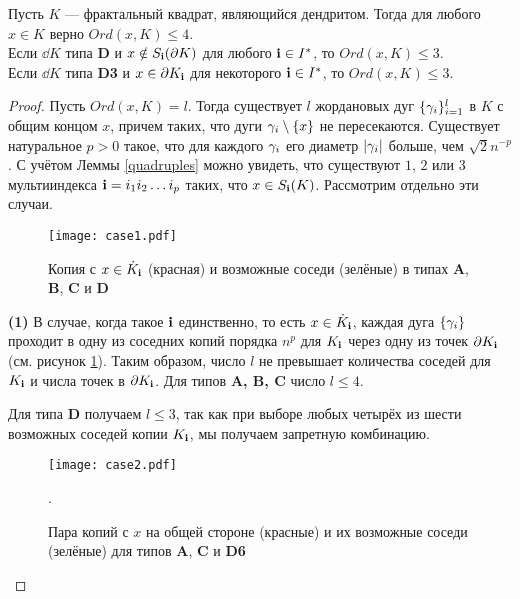 
\begin{theorem}\label{order}
Пусть $K$ --- фрактальный квадрат, являющийся дендритом. 
Тогда для любого  $x\in K$ верно $Ord(x,K)\le 4$.\\
Если $\dd K$ типа {\bf D} и $x\notin S_{\bf{i}}(\partial K)$ для любого ${\bf{i}}\in I^*$, то $Ord(x,K)\le 3$.\\
Если $\dd K$ типа {\bf D3} и $x\in \partial K_{\bf{i}}$ для некоторого ${\bf{i}}\in I^*$, то $Ord(x, K)\le 3$.
\end{theorem}

\begin{proof}\label{proof:point_branching}
Пусть $Ord(x,K)=l$.
Тогда существует $l$ жордановых дуг $\{\gamma_i\}_{i=1}^l$ в $K$ с общим концом $x$, причем таких, что дуги $\gamma_i\setminus \{x\}$ не пересекаются.
Существует натуральное $p>0$ такое, что для каждого $\gamma_i$ его диаметр $|\gamma_i|$ больше, чем $\sqrt{2}n^{-p}$.
С учётом Леммы \ref{quadruples} можно увидеть, что существуют $1$, $2$ или $3$ мультииндекса ${\bf{i}}=i_1i_2\ldots i_p$ таких, что $x\in S_{\bf{i}}(K)$.
Рассмотрим отдельно эти случаи.

\begin{figure}[H]
\centering
\texttt{[image: case1.pdf]}
\caption{Копия с $x\in\dot K_{\bf{i}}$ (красная) и возможные соседи (зелёные) в типах \textbf{A}, \textbf{B}, \textbf{C} и \textbf{D}}
\label{fig:case1}
\end{figure}

\textbf{(1)} В случае, когда такое ${\bf{i}}$ единственно, то есть $x\in \dot K_{\bf{i}}$, каждая дуга $\{\gamma_i\}$ проходит в одну из соседних копий порядка $n^p$ для $K_{\bf{i}}$ через одну из точек $\partial K_{\bf{i}}$ (см. рисунок \ref{fig:case1}). 
Таким образом, число $l$ не превышает количества соседей для $K_{\bf{i}}$  и числа точек в $\partial K_{\bf{i}}$. 
Для типов {\bf A, B, C} число $l\leq 4$.

Для типа {\bf D} получаем $l\le 3$, так как при выборе любых четырёх из шести возможных соседей копии $K_{\bf{i}}$, мы получаем запретную комбинацию.

\begin{figure}[H]
\centering
\texttt{[image: case2.pdf]}
\caption{Пара копий с $x$ на общей стороне (красные) и их возможные соседи (зелёные) для типов \textbf{A}, \textbf{C} и \textbf{D6}}. 
\label{fig:case2}
\end{figure}


\end{proof}
